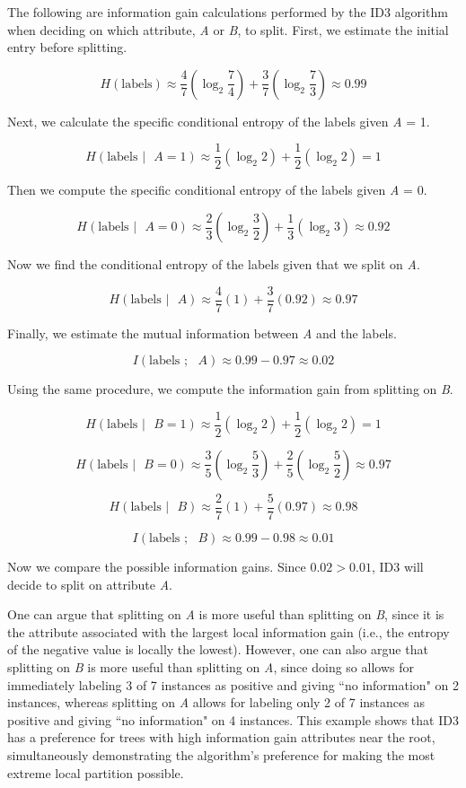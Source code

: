 \documentclass[solution, letterpaper]{cs121}
\begin{document}

\subproblem The following are information gain calculations performed by the ID3 algorithm when deciding on which attribute, \emph{A} or \emph{B}, to split. First, we estimate the initial entry before splitting.

\[ H(\text{labels}) \approx \frac{4}{7} (\log_2 \frac{7}{4}) + \frac{3}{7} (\log_2 \frac{7}{3}) \approx 0.99 \]

Next, we calculate the specific conditional entropy of the labels given \emph{A} = 1.

\[ H(\text{labels } | \text{ } A = 1) \approx \frac{1}{2} (\log_2 2) + \frac{1}{2} (\log_2 2) = 1 \]

Then we compute the specific conditional entropy of the labels given \emph{A} = 0.

\[ H(\text{labels } | \text{ } A = 0) \approx \frac{2}{3} (\log_2 \frac{3}{2}) + \frac{1}{3} (\log_2 3) \approx 0.92 \]

Now we find the conditional entropy of the labels given that we split on \emph{A}.

\[ H(\text{labels } | \text{ } A) \approx \frac{4}{7}(1) + \frac{3}{7}(0.92) \approx 0.97 \]

Finally, we estimate the mutual information between \emph{A} and the labels.

\[ I(\text{labels } ; \text{ } A) \approx  0.99 - 0.97 \approx 0.02\]

Using the same procedure, we compute the information gain from splitting on \emph{B}.

\[ H(\text{labels } | \text{ } B = 1) \approx  \frac{1}{2} (\log_2 2) + \frac{1}{2} (\log_2 2) = 1 \]

\[ H(\text{labels } | \text{ } B = 0) \approx  \frac{3}{5} (\log_2 \frac{5}{3}) + \frac{2}{5} (\log_2 \frac{5}{2}) \approx 0.97 \]

\[ H(\text{labels } | \text{ } B) \approx \frac{2}{7}(1) + \frac{5}{7}(0.97) \approx 0.98 \]

\[ I(\text{labels } ; \text{ } B) \approx  0.99 - 0.98 \approx 0.01 \]

Now we compare the possible information gains. Since $0.02 > 0.01$, ID3 will decide to split on attribute \emph{A}.

One can argue that splitting on \emph{A} is more useful than splitting on \emph{B}, since it is the attribute associated with the largest local information gain (i.e., the entropy of the negative value is locally the lowest). However, one can also argue that splitting on \emph{B} is more useful than splitting on \emph{A}, since doing so allows for immediately labeling 3 of 7 instances as positive and giving  ``no information" on 2 instances, whereas splitting on \emph{A} allows for labeling only 2 of 7 instances as positive and giving ``no information" on 4 instances. This example shows that ID3 has a preference for trees with high information gain attributes near the root, simultaneously demonstrating the algorithm's preference for making the most extreme local partition possible.
\end{document}
